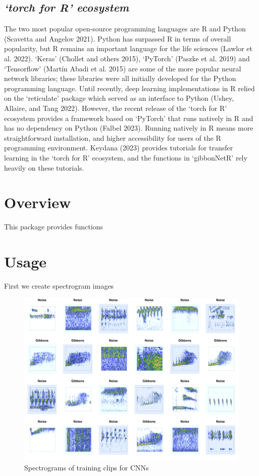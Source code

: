\documentclass{article}
\begin{document}
\hypertarget{torch-for-r-ecosystem}{%
\subsection{\texorpdfstring{\emph{`torch for R'
ecosystem}}{`torch for R' ecosystem}}\label{torch-for-r-ecosystem}}

The two most popular open-source programming languages are R and Python
(Scavetta and Angelov 2021). Python has surpassed R in terms of overall
popularity, but R remains an important language for the life sciences
(Lawlor et al. 2022). `Keras' (Chollet and others 2015), `PyTorch'
(Paszke et al. 2019) and `Tensorflow' (Martín Abadi et al. 2015) are
some of the more popular neural network libraries; these libraries were
all initially developed for the Python programming language. Until
recently, deep learning implementations in R relied on the `reticulate'
package which served as an interface to Python (Ushey, Allaire, and Tang
2022). However, the recent release of the `torch for R' ecosystem
provides a framework based on `PyTorch' that runs natively in R and has
no dependency on Python (Falbel 2023). Running natively in R means more
straightforward installation, and higher accessibility for users of the
R programming environment. Keydana (2023) provides tutorials for
transfer learning in the `torch for R' ecosystem, and the functions in
`gibbonNetR' rely heavily on these tutorials.

\hypertarget{overview}{%
\section{Overview}\label{overview}}

This package provides functions

\hypertarget{usage}{%
\section{Usage}\label{usage}}

First we create spectrogram images

\begin{figure}[ht]

{\centering \includegraphics[width=0.5\linewidth]{../README_files/spectro} 

}

\caption{Spectrograms of training clips for CNNs}\label{fig:unnamed-chunk-1}
\end{figure}
\end{document}
